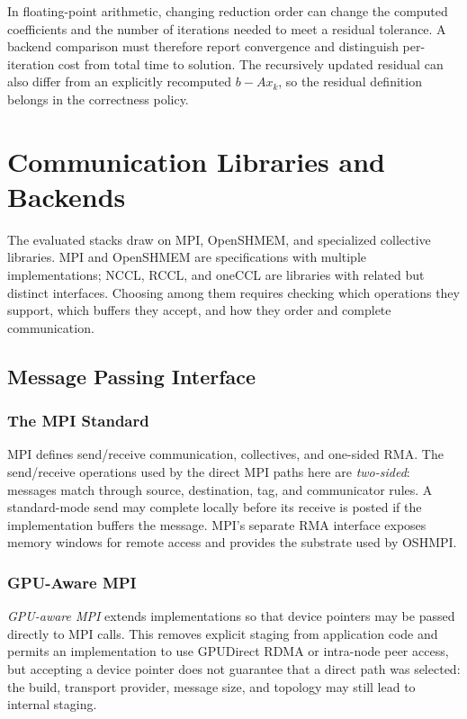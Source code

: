 In floating-point arithmetic, changing reduction order can change the computed coefficients and the number of iterations needed to meet a residual tolerance. A backend comparison must therefore report convergence and distinguish per-iteration cost from total time to solution. The recursively updated residual can also differ from an explicitly recomputed $b-Ax_k$, so the residual definition belongs in the correctness policy.

\section{Communication Libraries and Backends}\label{sec:backends}

The evaluated stacks draw on MPI, OpenSHMEM, and specialized collective libraries. MPI and OpenSHMEM are specifications with multiple implementations; NCCL, RCCL, and oneCCL are libraries with related but distinct interfaces. Choosing among them requires checking which operations they support, which buffers they accept, and how they order and complete communication.

\subsection{Message Passing Interface}\label{sec:mpi}

\subsubsection{The MPI Standard}

MPI defines send/receive communication, collectives, and one-sided \ac{RMA}. The send/receive operations used by the direct MPI paths here are \emph{two-sided}: messages match through source, destination, tag, and communicator rules. A standard-mode send may complete locally before its receive is posted if the implementation buffers the message. MPI's separate RMA interface exposes memory windows for remote access and provides the substrate used by OSHMPI.

\subsubsection{GPU-Aware MPI}

\emph{GPU-aware MPI} extends implementations so that device pointers may be passed directly to MPI calls. This removes explicit staging from application code and permits an implementation to use GPUDirect RDMA or intra-node peer access, but accepting a device pointer does not guarantee that a direct path was selected: the build, transport provider, message size, and topology may still lead to internal staging.

